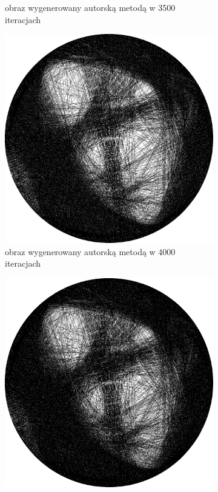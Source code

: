 \begin{figure}[H]
\begin{subfigure}{0.24\textwidth}
        \caption{obraz wygenerowany autorską metodą w 3500 iteracjach}
        \label{comp-comp-magdalene-e}
    \end{subfigure}
    \begin{subfigure}{0.24\textwidth}
        \centering
        \includegraphics[width = \textwidth]{img/6-comp/magdalene_e_i4000_c20_inv0_bg1_obj10_ed1.png}
        \caption{obraz wygenerowany autorską metodą w 4000 iteracjach}
        \label{comp-comp-magdalene-f}
    \end{subfigure}
    \begin{subfigure}{0.24\textwidth}
        \centering
        \includegraphics[width = \textwidth]{img/6-comp/magdalene_e_i4500_c20_inv0_bg1_obj10_ed1.png}

\end{subfigure}
\end{figure}
